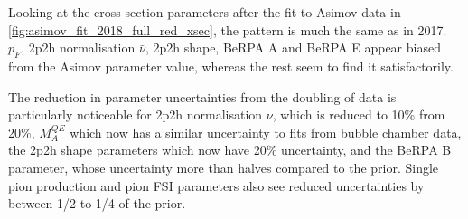 Looking at the cross-section parameters after the fit to Asimov data in \autoref{fig:asimov_fit_2018_full_red_xsec}, the pattern is much the same as in 2017. $p_F$, 2p2h normalisation $\bar{\nu}$, 2p2h shape, BeRPA A and BeRPA E appear biased from the Asimov parameter value, whereas the rest seem to find it satisfactorily. 

The reduction in parameter uncertainties from the doubling of data is particularly noticeable for 2p2h normalisation $\nu$, which is reduced to 10\% from 20\%, $M_A^{QE}$ which now has a similar uncertainty to fits from bubble chamber data, the 2p2h shape parameters which now have 20\% uncertainty, and the BeRPA B parameter, whose uncertainty more than halves compared to the prior. Single pion production and pion FSI parameters also see reduced uncertainties by between 1/2 to 1/4 of the prior.

